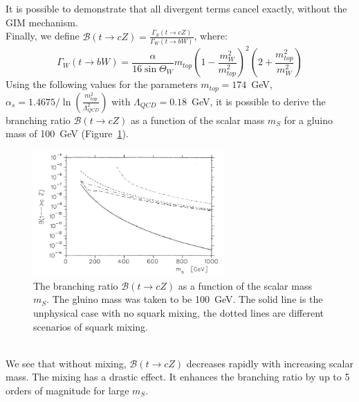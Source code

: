 It is possible to demonstrate that all divergent terms cancel exactly, without the GIM mechanism.\\
Finally, we define $\mathcal{B}(t \rightarrow cZ)=\frac{\Gamma_{S}(t \rightarrow cZ)}{\Gamma_{W}(t \rightarrow bW)}$, where:
\begin{equation} 
\Gamma_{W}(t \rightarrow bW) = \frac{\alpha}{16\sin{\Theta_W}} m_{top} \left(1-\frac{m^{2}_{W}}{m^{2}_{top}}\right)^2 \left(2+\frac{m^{2}_{top}}{m^{2}_{W}}\right)
\end{equation}
Using the following values for the parameters $m_{top}=174$~GeV, $\alpha_{s}=1.4675/\ln{\left( \frac{m^{2}_{top}}{\Lambda^{2}_{QCD}} \right)}$ with $\Lambda_{QCD}=0.18$~GeV, it is
possible to derive the branching ratio $\mathcal{B}(t \rightarrow cZ)$ as a function of the scalar mass $m_{S}$ for a gluino mass of 100~GeV (Figure~\ref{fig:BR_mssm}).
\begin{figure}[!h]
	\centering
	\includegraphics[width=0.65\textwidth]{Chapters/CH1/figures/BR_mssm}
	\caption{The branching ratio $\mathcal{B}(t \rightarrow cZ)$ as a function of the scalar mass $m_{S}$. The gluino mass was taken to be 100~GeV. The solid line is the unphysical case 
		with no squark mixing, the dotted lines are different scenarios of squark mixing\cite{coulture_mssm}.}
	\label{fig:BR_mssm}
\end{figure}
\\We see that without mixing, $\mathcal{B}(t \rightarrow cZ)$ decreases rapidly with increasing scalar mass. The mixing has a drastic effect. It enhances the branching ratio by up to 
5 orders of magnitude for large $m_{S}$.
\clearpage
\let\cleardoublepage\clearpage

